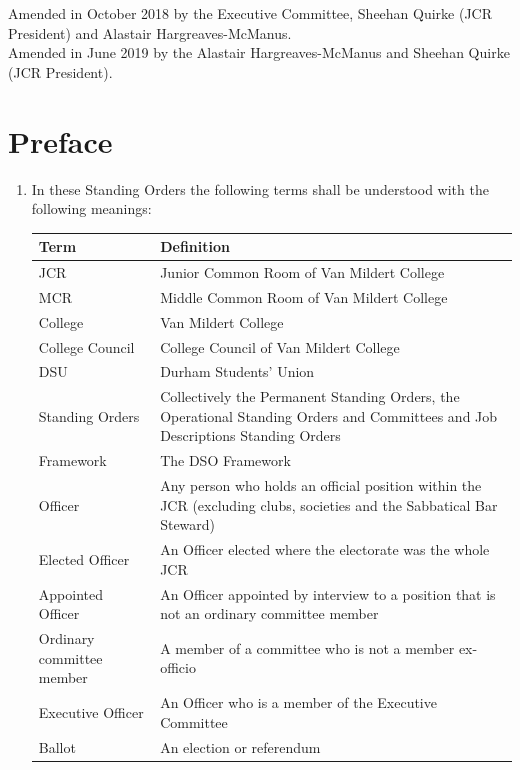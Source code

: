 \documentclass[12pt]{article}  %
\begin{document}
Amended in October 2018 by the Executive Committee, Sheehan Quirke (JCR President) and Alastair Hargreaves-McManus.\\
Amended in June 2019 by the Alastair Hargreaves-McManus and Sheehan Quirke (JCR President).
\newpage
\tableofcontents{}
\newpage


\section{Preface}
\begin{enumerate}
    \item In these Standing Orders the following terms shall be understood with the following meanings:\\
\begin{tabular}{|p{1.5in}|p{3.8in}|}\hline
    \textbf{Term}           & \textbf{Definition}\\ \hline
    JCR                     & Junior Common Room of Van Mildert College\\ \hline
    MCR                     & Middle Common Room of Van Mildert College\\ \hline
    College                 & Van Mildert College\\ \hline
    College Council         & College Council of Van Mildert College\\ \hline
    DSU                     & Durham Students' Union\\ \hline
    Standing Orders         & Collectively the Permanent Standing Orders, the Operational Standing Orders and Committees and Job Descriptions Standing Orders \\ \hline
    Framework               & The DSO Framework\\ \hline
    Officer                 & Any person who holds an official position within the JCR (excluding clubs, societies and the Sabbatical Bar Steward) \\ \hline
    Elected Officer         & An Officer elected where the electorate was the whole JCR \\ \hline
    Appointed Officer       & An Officer appointed by interview to a position that is not an ordinary committee member \\ \hline
    Ordinary committee member & A member of a committee who is not a member ex-officio \\ \hline
    Executive Officer       & An Officer who is a member of the Executive Committee \\ \hline
    Ballot                  & An election or referendum \\ \hline

\end{tabular}
\end{enumerate}
\end{document}
